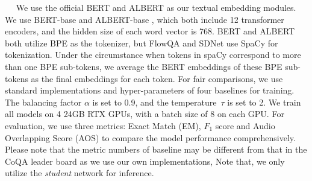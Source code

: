 \documentclass[11pt]{article}
\newcommand{\myparagraph}[1]{\vspace{2pt}\noindent{\bf{#1}}~~}
\begin{document}
\myparagraph{Experiment Settings.}
We use the official BERT \cite{devlin2018bert} and ALBERT \cite{lan2019albert} as our textual embedding modules. We use BERT-base \cite{devlin2018bert} and ALBERT-base \cite{lan2019albert}, which both include 12 transformer encoders, and the hidden size of each word vector is 768. BERT and ALBERT both utilize BPE as the tokenizer, but FlowQA and SDNet use SpaCy \cite{spacy2} for tokenization. Under the circumstance when tokens in spaCy \cite{spacy2} correspond to more than one BPE sub-tokens, we average the BERT embeddings of these BPE sub-tokens as the final embeddings for each token. For fair comparisons, we use standard implementations and hyper-parameters of four baselines for training. The balancing factor $\alpha$ is set to 0.9, and the temperature~$\tau$ is set to 2. We train all models on 4 24GB RTX GPUs, with a batch size of 8 on each GPU. For evaluation, we use three metrics: Exact Match (EM), $F_1$ score and Audio Overlapping Score (AOS) \cite{li2018spoken}  to compare the model performance comprehensively. Please note that the metric numbers of baseline may be different from that in the CoQA leader board as we use our own implementations, Note that, we only utilize the {\em student} network for inference.
\end{document}
